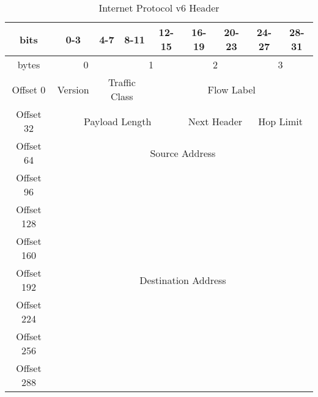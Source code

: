 \begin{table}[H]
	\centering
	\label{ipv6-header}
	\begin{tabular}{|c|c|c|c|c|c|c|c|c|}
		\hline
		bits       & 0-3          & 4-7             & 8-11             & 12-15      & 16-19           & 20-23          & 24-27          & 28-31         \\ \hline
		bytes      & \multicolumn{2}{c|}{0}         & \multicolumn{2}{c|}{1}        & \multicolumn{2}{c|}{2}           & \multicolumn{2}{c|}{3}         \\ \hline
		Offset 0   & Version      & \multicolumn{2}{c|}{Traffic Class} & \multicolumn{5}{c|}{Flow Label}                                                \\ \hline
		Offset 32  & \multicolumn{4}{c|}{Payload Length}                            & \multicolumn{2}{c|}{Next Header} & \multicolumn{2}{c|}{Hop Limit} \\ \hline
		Offset 64  & \multicolumn{8}{c|}{Source Address}                                                                               \\ \cline{1-1}
		Offset 96  & \multicolumn{8}{c|}{}                                                                                                              \\ \cline{1-1}
		Offset 128 & \multicolumn{8}{c|}{}                                                                                                              \\ \cline{1-1}
		Offset 160 & \multicolumn{8}{c|}{}                                                                                                              \\ \hline
		Offset 192 & \multicolumn{8}{c|}{Destination Address}                                                                         \\ \cline{1-1}
		Offset 224 & \multicolumn{8}{c|}{}                                                                                                              \\ \cline{1-1}
		Offset 256 & \multicolumn{8}{c|}{}                                                                                                              \\ \cline{1-1}
		Offset 288 & \multicolumn{8}{c|}{}                                                                                                              \\ \hline
	\end{tabular}
	\caption{Internet Protocol v6 Header}
\end{table}

